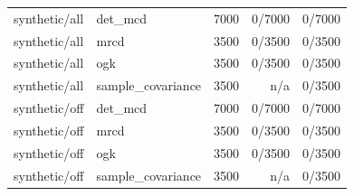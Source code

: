 \begin{tabular}{llrrr}
synthetic/all & det\_mcd & 7000 & 0/7000 & 0/7000 \\
synthetic/all & mrcd & 3500 & 0/3500 & 0/3500 \\
synthetic/all & ogk & 3500 & 0/3500 & 0/3500 \\
synthetic/all & sample\_covariance & 3500 & n/a & 0/3500 \\
synthetic/off & det\_mcd & 7000 & 0/7000 & 0/7000 \\
synthetic/off & mrcd & 3500 & 0/3500 & 0/3500 \\
synthetic/off & ogk & 3500 & 0/3500 & 0/3500 \\
synthetic/off & sample\_covariance & 3500 & n/a & 0/3500 \\
\end{tabular}
